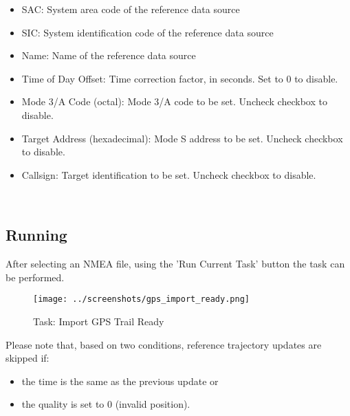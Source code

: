 \begin{itemize}  
\item SAC: System area code of the reference data source
\item SIC: System identification code of the reference data source
\item Name: Name of the reference data source
\item Time of Day Offset: Time correction factor, in seconds. Set to 0 to disable.
\item Mode 3/A Code (octal): Mode 3/A code to be set. Uncheck checkbox to disable.
\item Target Address (hexadecimal): Mode S address to be set. Uncheck checkbox to disable.
\item Callsign: Target identification to be set. Uncheck checkbox to disable.
\end{itemize}
\ \\

\subsection{Running}

After selecting an NMEA file, using the 'Run Current Task' button the task can be performed.

\begin{figure}[H]
    \texttt{[image: ../screenshots/gps\_import\_ready.png]}
  \caption{Task: Import GPS Trail Ready}
\end{figure}

Please note that, based on two conditions, reference trajectory updates are skipped if:
\begin{itemize}  
\item the time is the same as the previous update or
\item the quality is set to 0 (invalid position).
\end{itemize}
